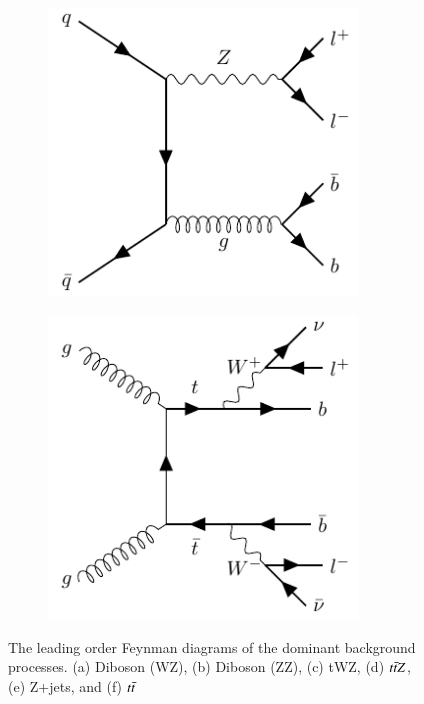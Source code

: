\begin{figure}[!h]
\begin{subfigure}[b]{0.3\linewidth}
    \includegraphics[width=0.9\textwidth]{ubonn-thesis/Chapters/Chapters_04/Figure/ZPlusJets_standalone.pdf} 
    \caption{}
    \label{Z+jets}
  \end{subfigure} 
  \begin{subfigure}[b]{0.3\linewidth}
    \centering
    \includegraphics[width=0.9\textwidth]{ubonn-thesis/Chapters/Chapters_04/Figure/ttbar_standalone.pdf} 
    \caption{}
    \label{ttbar}
  \end{subfigure} 
  \caption{The leading order Feynman diagrams of the dominant background processes. (a) Diboson (WZ), (b) Diboson (ZZ), (c) tWZ, (d) $t\Bar{t}Z$, (e) Z+jets, and (f) $t\Bar{t}$}
  \label{background_feynman}
\end{figure}


